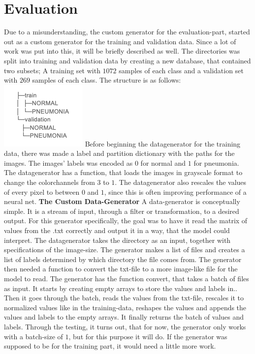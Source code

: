 \section{Evaluation}
Due to a misunderstanding, the custom generator for the evaluation-part, started out as a custom generator for the training and validation data. Since a lot of work was put into this, it will be briefly described as well. The directories was split into training and validation data by creating a new database, that contained two subsets; A training set with $1072$ samples of each class and a validation set with $269$ samples of each class.  The structure is as follows: 
\newline
\includegraphics[scale=0.5]{dir}
\newline
\newline
Before beginning the datagenerator for the training data, there was made a label and partition dictionary with the paths for the images. The images' labels was encoded as $0$ for normal and $1$ for pneumonia. The datagenerator has a function, that loads the images in grayscale format to change the colorchannels from $3$ to $1$. The datagenerator also rescales the values of every pixel to between $0$ and $1$, since this is often improving performance of a neural net. 
\newline
\newline
\textbf{The Custom Data-Generator}
\newline
A data-generator is conceptually simple. It is a stream of input, through a filter or transformation, to a desired output.
For this generator specifically, the goal was to have it read the matrix of values from the .txt correctly and output it in a way, that the model could interpret. The datagenerator takes the directory as an input, together with specifications of the image-size. The generator makes a list of files and creates a list of labels determined by which directory the file comes from. The generator then needed a function to convert the txt-file to a more image-like file for the model to read. The generator has the function convert,  that takes a batch of files as input. It starts by creating empty arrays to store the values and labels in..  Then it goes through the batch, reads the values from the txt-file, rescales it to normalized values like in the training-data, reshapes the values and appends the values and labels to the empty arrays. It finally returns the batch of values and labels. Through the testing, it turns out, that for now, the generator only works with a batch-size of $1$, but for this purpose it will do. If the generator was supposed to be for the training part, it would need a little more work.  